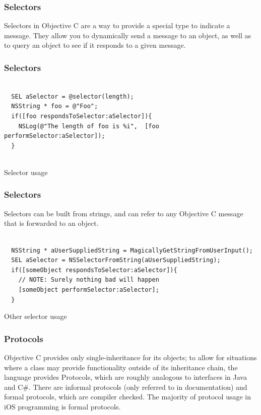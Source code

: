 \documentclass[10pt]{beamer}
\begin{document}
    
\begin{frame}[fragile]
  \frametitle{Selectors}
  Selectors in Objective C are a way to provide a special type to indicate a message. They allow you to dynamically send a message to an object, as well as to query an object to see if it responds to a given message.

\end{frame}

\begin{frame}[fragile]
  \frametitle{Selectors}
  \begin{listing}[H]
    \begin{verbatim}

  SEL aSelector = @selector(length);
  NSString * foo = @"Foo";
  if([foo respondsToSelector:aSelector]){
    NSLog(@"The length of foo is %i",  [foo performSelector:aSelector]);
  }


  \end{verbatim}
    \caption{Selector usage}
    \label{listing:13}
  \end{listing}

\end{frame}

\begin{frame}[fragile]
  \frametitle{Selectors}
  Selectors can be built from strings, and can refer to any Objective C message that is forwarded to an object. \begin{listing}[H]
    \begin{verbatim}

  NSString * aUserSuppliedString = MagicallyGetStringFromUserInput();
  SEL aSelector = NSSelectorFromString(aUserSuppliedString);
  if([someObject respondsToSelector:aSelector]){
    // NOTE: Surely nothing bad will happen
    [someObject performSelector:aSelector];
  }

  \end{verbatim}
    \caption{Other selector usage}
    \label{listing:14}
  \end{listing}

\end{frame}

    
\begin{frame}[fragile]
  \frametitle{Protocols}
  Objective C provides only single-inheritance for its objects; to allow for situations where a class may provide functionality outside of its inheritance chain, the language provides Protocols, which are roughly analogous to interfaces in Java and C\#.  There are informal protocols (only referred to in documentation) and formal protocols, which are compiler checked.  The majority of protocol usage in iOS programming is formal protocols.

\end{frame}
\end{document}
